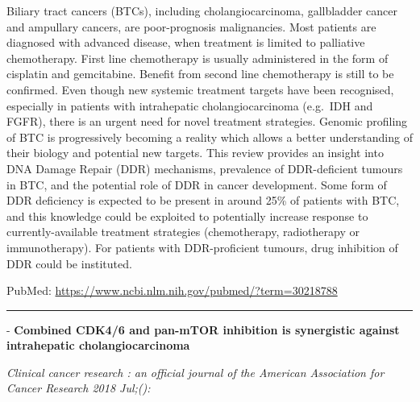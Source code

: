 \documentclass[]{article}
\begin{document}
Biliary tract cancers (BTCs), including cholangiocarcinoma, gallbladder
cancer and ampullary cancers, are poor-prognosis malignancies. Most
patients are diagnosed with advanced disease, when treatment is limited
to palliative chemotherapy. First line chemotherapy is usually
administered in the form of cisplatin and gemcitabine. Benefit from
second line chemotherapy is still to be confirmed. Even though new
systemic treatment targets have been recognised, especially in patients
with intrahepatic cholangiocarcinoma (e.g.~IDH and FGFR), there is an
urgent need for novel treatment strategies. Genomic profiling of BTC is
progressively becoming a reality which allows a better understanding of
their biology and potential new targets. This review provides an insight
into DNA Damage Repair (DDR) mechanisms, prevalence of DDR-deficient
tumours in BTC, and the potential role of DDR in cancer development.
Some form of DDR deficiency is expected to be present in around 25\% of
patients with BTC, and this knowledge could be exploited to potentially
increase response to currently-available treatment strategies
(chemotherapy, radiotherapy or immunotherapy). For patients with
DDR-proficient tumours, drug inhibition of DDR could be instituted.

PubMed: \url{https://www.ncbi.nlm.nih.gov/pubmed/?term=30218788}

{}

{}

\begin{center}\rule{0.5\linewidth}{\linethickness}\end{center}

 - \textbf{Combined CDK4/6 and pan-mTOR inhibition is synergistic
against intrahepatic cholangiocarcinoma}

\emph{Clinical cancer research : an official journal of the American
Association for Cancer Research 2018 Jul;():}
\end{document}
